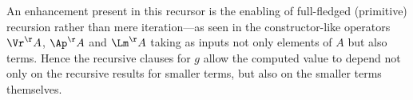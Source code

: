 
%
%
An enhancement  present in this recursor is 
the enabling of full-fledged (primitive) recursion rather than mere iteration---as seen in the constructor-like operators  %
$\Vr^\AA$, 
$\Ap^\AA$ and 
$\Lm^\AA$ taking as inputs not only elements of $A$ but also 
terms. %
Hence the recursive clauses for %
$g$ allow 
the computed value to depend not only on the recursive results for smaller terms, but also on the smaller terms themselves. 



